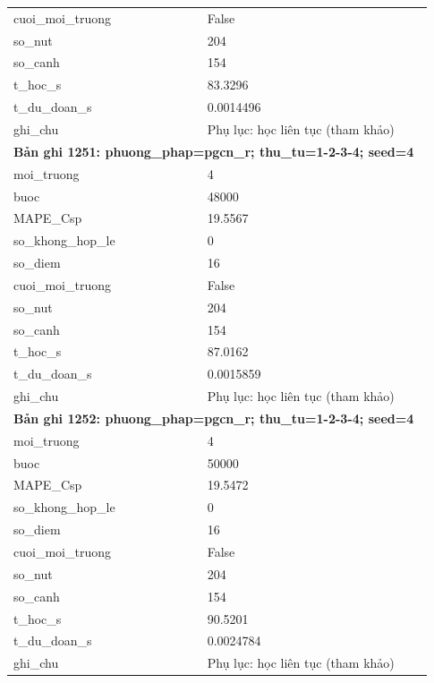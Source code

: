 \begin{longtable}{p{0.43\linewidth}p{0.50\linewidth}}
cuoi\_\allowbreak moi\_\allowbreak truong & False \\
so\_\allowbreak nut & 204 \\
so\_\allowbreak canh & 154 \\
t\_\allowbreak hoc\_\allowbreak s & 83.3296 \\
t\_\allowbreak du\_\allowbreak doan\_\allowbreak s & 0.0014496 \\
ghi\_\allowbreak chu & Phụ lục: học liên tục (tham khảo) \\
\midrule
\multicolumn{2}{p{0.95\linewidth}}{\textbf{Bản ghi 1251: phuong\_phap=pgcn\_r; thu\_tu=1-2-3-4; seed=4}} \\
moi\_\allowbreak truong & 4 \\
buoc & 48000 \\
MAPE\_\allowbreak Csp & 19.5567 \\
so\_\allowbreak khong\_\allowbreak hop\_\allowbreak le & 0 \\
so\_\allowbreak diem & 16 \\
cuoi\_\allowbreak moi\_\allowbreak truong & False \\
so\_\allowbreak nut & 204 \\
so\_\allowbreak canh & 154 \\
t\_\allowbreak hoc\_\allowbreak s & 87.0162 \\
t\_\allowbreak du\_\allowbreak doan\_\allowbreak s & 0.0015859 \\
ghi\_\allowbreak chu & Phụ lục: học liên tục (tham khảo) \\
\midrule
\multicolumn{2}{p{0.95\linewidth}}{\textbf{Bản ghi 1252: phuong\_phap=pgcn\_r; thu\_tu=1-2-3-4; seed=4}} \\
moi\_\allowbreak truong & 4 \\
buoc & 50000 \\
MAPE\_\allowbreak Csp & 19.5472 \\
so\_\allowbreak khong\_\allowbreak hop\_\allowbreak le & 0 \\
so\_\allowbreak diem & 16 \\
cuoi\_\allowbreak moi\_\allowbreak truong & False \\
so\_\allowbreak nut & 204 \\
so\_\allowbreak canh & 154 \\
t\_\allowbreak hoc\_\allowbreak s & 90.5201 \\
t\_\allowbreak du\_\allowbreak doan\_\allowbreak s & 0.0024784 \\
ghi\_\allowbreak chu & Phụ lục: học liên tục (tham khảo) \\

\end{longtable}
